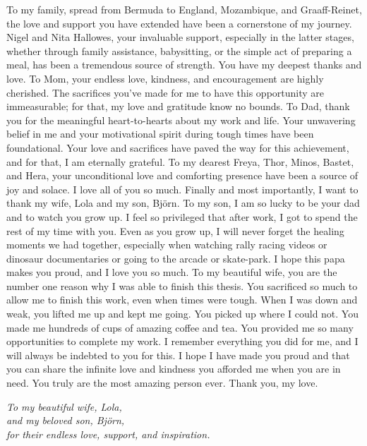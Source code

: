 \documentclass[
11pt, %
english, %
onehalfspacing, %
headsepline, %
]{MastersDoctoralThesis} %
\theoremstyle{customdefstyle}
\begin{document}
\begin{acknowledgements}
    To my family, spread from Bermuda to England, Mozambique, and Graaff-Reinet, the love and support you have extended have been a cornerstone of my journey. Nigel and Nita Hallowes, your invaluable support, especially in the latter stages, whether through family assistance, babysitting, or the simple act of preparing a meal, has been a tremendous source of strength. You have my deepest thanks and love. To Mom, your endless love, kindness, and encouragement are highly cherished. The sacrifices you've made for me to have this opportunity are immeasurable; for that, my love and gratitude know no bounds. To Dad, thank you for the meaningful heart-to-hearts about my work and life. Your unwavering belief in me and your motivational spirit during tough times have been foundational. Your love and sacrifices have paved the way for this achievement, and for that, I am eternally grateful. To my dearest Freya, Thor, Minos, Bastet, and Hera, your unconditional love and comforting presence have been a source of joy and solace. I love all of you so much. Finally and most importantly, I want to thank my wife, Lola and my son, Björn. To my son, I am so lucky to be your dad and to watch you grow up. I feel so privileged that after work, I got to spend the rest of my time with you. Even as you grow up, I will never forget the healing moments we had together, especially when watching rally racing videos or dinosaur documentaries or going to the arcade or skate-park. I hope this papa makes you proud, and I love you so much. To my beautiful wife, you are the number one reason why I was able to finish this thesis. You sacrificed so much to allow me to finish this work, even when times were tough. When I was down and weak, you lifted me up and kept me going. You picked up where I could not. You made me hundreds of cups of amazing coffee and tea. You provided me so many opportunities to complete my work. I remember everything you did for me, and I will always be indebted to you for this. I hope I have made you proud and that you can share the infinite love and kindness you afforded me when you are in need. You truly are the most amazing person ever. Thank you, my love.
\end{acknowledgements}

\cleardoublepage
\begin{center}
\noindent\textit{\Large To my beautiful wife, \emph{Lola},}\\[1cm]
\textit{\Large and my beloved son, \emph{Björn},}\\[1cm]
\textit{\Large for their endless love, support, and inspiration.}    
\end{center}
\vfill
\end{document}
